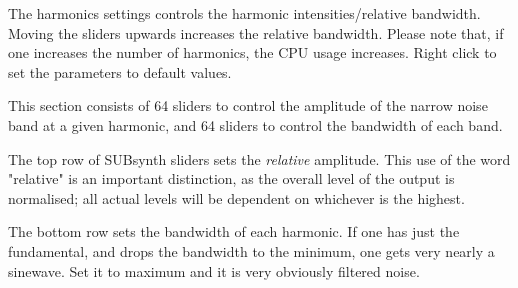    The harmonics settings controls the harmonic intensities/relative bandwidth.
   Moving the sliders upwards increases the relative bandwidth.  Please note
   that, if one increases the number of harmonics, the CPU usage increases. Right
   click to set the parameters to default values.

   This section consists of 64 sliders to control the amplitude of the narrow
   noise band at a given harmonic, and 64 sliders to control the bandwidth of
   each band.

   The top row of SUBsynth sliders sets the \textsl{relative} amplitude.  This
   use of the word "relative" is an important distinction, as the overall level
   of the output is normalised; all actual levels will be dependent on whichever
   is the highest.

   The bottom row sets the bandwidth of each harmonic. If one has just the
   fundamental, and drops the bandwidth to the minimum, one gets very nearly a
   sinewave.  Set it to maximum and it is very obviously filtered noise.


